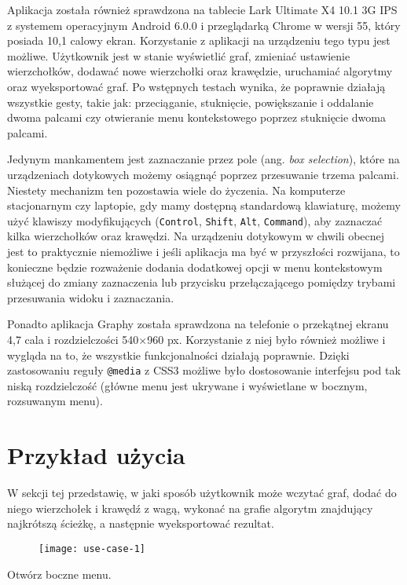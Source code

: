Aplikacja została również sprawdzona na tablecie Lark Ultimate X4 10.1 3G IPS z systemem operacyjnym Android 6.0.0 i przeglądarką Chrome w wersji 55, który posiada 10,1 calowy ekran. Korzystanie z aplikacji na urządzeniu tego typu jest możliwe. Użytkownik jest w stanie wyświetlić graf, zmieniać ustawienie wierzchołków, dodawać nowe wierzchołki oraz krawędzie, uruchamiać algorytmy oraz wyeksportować graf. Po wstępnych testach wynika, że poprawnie działają wszystkie gesty, takie jak: przeciąganie, stuknięcie, powiększanie i oddalanie dwoma palcami czy otwieranie menu kontekstowego poprzez stuknięcie dwoma palcami. 

Jedynym mankamentem jest zaznaczanie przez pole (ang. \textit{box selection}), które na urządzeniach dotykowych możemy osiągnąć poprzez przesuwanie trzema palcami. Niestety mechanizm ten pozostawia wiele do życzenia. Na komputerze stacjonarnym czy laptopie, gdy mamy dostępną standardową klawiaturę, możemy użyć klawiszy modyfikujących (\texttt{Control}, \texttt{Shift}, \texttt{Alt}, \texttt{Command}), aby zaznaczać kilka wierzchołków oraz krawędzi. Na urządzeniu dotykowym w chwili obecnej jest to praktycznie niemożliwe i jeśli aplikacja ma być w przyszłości rozwijana, to konieczne będzie rozważenie dodania dodatkowej opcji w menu kontekstowym służącej do zmiany zaznaczenia lub przycisku przełączającego pomiędzy trybami przesuwania widoku i zaznaczania. 

Ponadto aplikacja Graphy została sprawdzona na telefonie o przekątnej ekranu 4,7 cala i rozdzielczości 540$\times$960 px. Korzystanie z niej było również możliwe i wygląda na to, że wszystkie funkcjonalności działają poprawnie. Dzięki zastosowaniu reguły \texttt{@media} z CSS3 możliwe było dostosowanie interfejsu pod tak niską rozdzielczość (główne menu jest ukrywane i wyświetlane w bocznym, rozsuwanym menu). 

\section{Przykład użycia}

W sekcji tej przedstawię, w jaki sposób użytkownik może wczytać graf, dodać do niego wierzchołek i krawędź z wagą, wykonać na grafie algorytm znajdujący najkrótszą ścieżkę, a następnie wyeksportować rezultat.

\begin{figure}[H]
\centerline{\texttt{[image: use-case-1]}}
\end{figure}
\begin{enumerate}
\begin{footnotesize}
\setlength{\itemsep}{0pt}
\setlength{\parskip}{0pt}
\item Otwórz boczne menu.
\end{footnotesize}
\end{enumerate}

